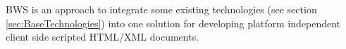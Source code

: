 BWS is an approach to integrate some existing technologies (see section \ref{sec:BaseTechnologies}) into one solution for developing platform independent client side scripted HTML/XML documents.